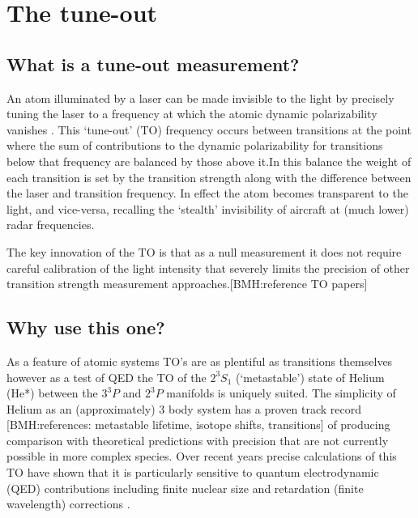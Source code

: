 \documentclass[aps,prl,
,reprint,
superscriptaddress,
onecolumn,
showpacs,preprintnumbers,
 amsmath,amssymb,
]{revtex4-1}
\newcommand{\MetastableState}{2^{3\!}S_1}%
\newcommand{\UpperStateManifold}{3^{3\!}P}%
\newcommand{\LowerStateManifold}{2^{3\!}P}%
\newcommand{\brycerev}[1]{{\color{Purple}{#1}\normalcolor}} %
\newcommand{\brycecom}[1]{{\color{ProcessBlue}[BMH:{#1}]\normalcolor}} %
\begin{document}
\section{The tune-out}
\subsection{What is a tune-out measurement?}
An atom illuminated by a laser can be made invisible to the light by precisely tuning the laser to a frequency at which the atomic dynamic polarizability vanishes \cite{Drake2019}.
This ‘tune-out’ (TO) frequency \cite{PhysRevA.75.053612} occurs between transitions at the point where the sum of contributions to the dynamic polarizability for transitions below that frequency are balanced by those above it.In this balance the weight of each transition is set by the transition strength along with the difference between the laser and transition frequency.
In effect the atom becomes transparent to the light, and vice-versa, recalling the `stealth' invisibility of aircraft at (much lower) radar frequencies. 

The key innovation of the TO is that as a null measurement it does not require careful calibration of the light intensity that severely limits the precision of other transition strength measurement approaches.\brycecom{reference TO papers}


\subsection{Why use this one?}
As a feature of atomic systems TO's are as plentiful as transitions themselves however as a test of QED the TO of the \(\MetastableState\) (`metastable’) state of Helium (He*) between the \(\UpperStateManifold\) and \(\LowerStateManifold\) manifolds is uniquely suited.
The simplicity of Helium as an (approximately) 3 body system has a proven track record \brycecom{references: metastable lifetime, isotope shifts, transitions} of producing comparison with theoretical predictions with precision that are not currently possible in more complex species.
Over recent years precise calculations of this TO have shown that it is particularly sensitive to quantum electrodynamic (QED) contributions \cite{PhysRevA.88.052515} including finite nuclear size \cite{PhysRevA.99.040502} and retardation (finite wavelength) corrections \cite{Drake2019}.
\end{document}

